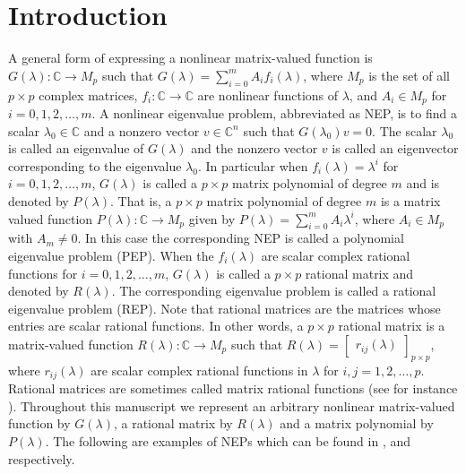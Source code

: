 \documentclass[12pt, reqno]{amsart}
\theoremstyle{definition}
\theoremstyle{remark}
\numberwithin{equation}{section}
\begin{document}
\section{Introduction}\label{sec-1}

A general form of expressing a nonlinear matrix-valued function 
is $G(\lambda) \colon \mathbb{C} \to M_p$ such that $G(\lambda) = \displaystyle 
\sum_{i=0}^{m} A_i f_i(\lambda)$, where $M_p$ is the set of all $p \times p$ complex 
matrices, $f_i \colon \mathbb{C} \to \mathbb{C}$ are nonlinear functions of 
$\lambda$, and $A_i \in M_p$ for $i=0,1,2,\ldots,m$. A nonlinear eigenvalue 
problem, abbreviated as NEP, is to find a scalar $\lambda_0 \in \mathbb{C}$ 
and a nonzero vector $v \in \mathbb{C}^n$ such that $G(\lambda_0)v = 0$. The 
scalar $\lambda_0$ is called an eigenvalue of $G(\lambda)$ and the nonzero 
vector $v$ is called an eigenvector corresponding to the eigenvalue $\lambda_0$. 
In particular when $f_i(\lambda) = \lambda^i$ for $i=0,1,2,\ldots,m$, 
$G(\lambda)$ is called a $p \times p$ matrix polynomial of degree $m$ and is 
denoted by $P(\lambda)$. That is, a $p\times p$ matrix polynomial of degree $m$ 
is a matrix valued function $P(\lambda)\colon \mathbb{C} \to M_p$ given by 
$P(\lambda)= \displaystyle \sum_{i=0}^{m} A_i\lambda^i$, where $A_i \in M_p$ with 
$A_m \neq 0$. In this case the corresponding NEP is called a polynomial eigenvalue 
problem (PEP). When the $f_i(\lambda)$ are scalar complex rational functions for 
$i=0,1,2,\ldots,m$, $G(\lambda)$ is called a $p\times p$ rational matrix and 
denoted by $R(\lambda)$. The corresponding eigenvalue problem is called a rational 
eigenvalue problem (REP). Note that rational matrices are the matrices whose 
entries are scalar rational functions. In other words, a $p\times p$ rational 
matrix is a matrix-valued function $R(\lambda)\colon \mathbb{C} \to M_p$ such 
that $R(\lambda) = \begin{bmatrix}
r_{ij}(\lambda)
\end{bmatrix} _{p\times p}$, where $r_{ij}(\lambda)$ are scalar complex rational 
functions in $\lambda$ for $i,j=1,2,\ldots,p$. Rational matrices are sometimes 
called matrix rational functions (see for instance \cite{Su-Bai}). Throughout 
this manuscript we represent an arbitrary nonlinear matrix-valued function by 
$G(\lambda)$, a rational matrix by $R(\lambda)$ and a matrix polynomial by 
$P(\lambda)$. The following are examples of NEPs which can be found in 
\cite{Saad-Guide-Meidlar}, \cite{Su-Bai} 
and \cite{Betcke-Higham-Tisseur} respectively.
\end{document}
